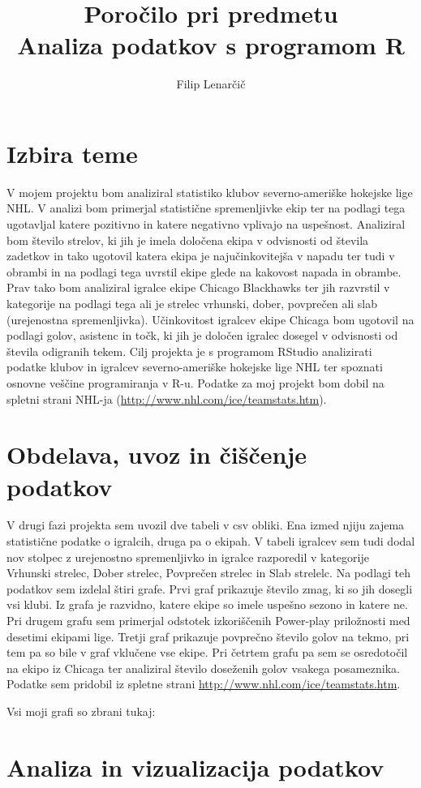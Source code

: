\documentclass[11pt,a4paper]{article}
\begin{document}
\title{Poročilo pri predmetu \\
Analiza podatkov s programom R}
\author{Filip Lenarčič}
\maketitle

\section{Izbira teme}

V mojem projektu bom analiziral statistiko klubov severno-ameriške hokejske lige NHL.  V analizi bom primerjal statistične spremenljivke ekip ter na podlagi tega ugotavljal katere pozitivno in katere negativno vplivajo na uspešnost. Analiziral bom število strelov, ki jih je imela določena ekipa v odvisnosti od števila zadetkov in tako ugotovil katera ekipa je najučinkovitejša v napadu ter tudi v obrambi in na podlagi tega uvrstil ekipe glede na kakovost napada in obrambe. Prav tako bom analiziral igralce ekipe Chicago Blackhawks ter jih razvrstil v kategorije na podlagi tega ali je strelec vrhunski, dober, povprečen ali slab (urejenostna spremenljivka).  Učinkovitost igralcev ekipe Chicaga bom ugotovil na podlagi golov, asistenc in točk, ki jih je določen igralec dosegel v odvisnosti od števila odigranih tekem.
Cilj projekta je s programom RStudio analizirati podatke klubov in igralcev severno-ameriške hokejske lige NHL ter spoznati osnovne veščine programiranja v R-u. Podatke za moj projekt bom dobil na spletni strani NHL-ja (\url{http://www.nhl.com/ice/teamstats.htm}).


\section{Obdelava, uvoz in čiščenje podatkov}

V drugi fazi projekta sem uvozil dve tabeli v csv obliki. Ena izmed njiju zajema statistične podatke o igralcih, druga pa o ekipah. V tabeli igralcev sem tudi dodal nov stolpec z urejenostno spremenljivko in igralce razporedil v kategorije Vrhunski strelec, Dober strelec, Povprečen strelec in Slab strelelc. Na podlagi teh podatkov sem izdelal štiri grafe. Prvi graf prikazuje število zmag, ki so jih dosegli vsi klubi. Iz grafa je razvidno, katere ekipe so imele uspešno sezono in katere ne. Pri drugem grafu sem primerjal odstotek izkoriščenih Power-play priložnosti med desetimi ekipami lige. Tretji graf prikazuje povprečno število golov na tekmo, pri tem pa so bile v graf vklučene vse ekipe. Pri četrtem grafu pa sem se osredotočil na ekipo iz Chicaga ter analiziral število doseženih golov vsakega posameznika. Podatke sem pridobil iz spletne strani \url{http://www.nhl.com/ice/teamstats.htm}. 

Vsi moji grafi so zbrani tukaj:



\section{Analiza in vizualizacija podatkov}

% 
% 
\end{document}
